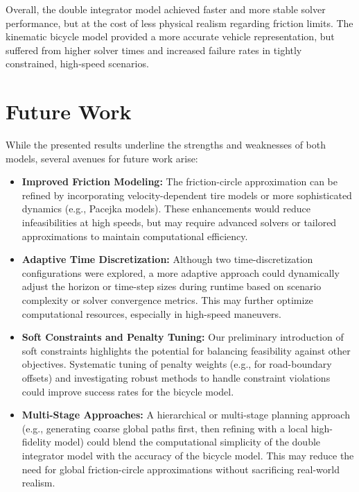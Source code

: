 Overall, the double integrator model achieved faster and more stable solver performance, but at the cost of less physical realism regarding friction
limits.
The kinematic bicycle model provided a more accurate vehicle representation, but suffered from higher solver times and increased failure rates in
tightly constrained, high-speed scenarios.

\section{Future Work} \label{subsec:future_work}

While the presented results underline the strengths and weaknesses of both models, several avenues for future work arise:

\begin{itemize} \item \textbf{Improved Friction Modeling:}
	      The friction-circle approximation can be refined by incorporating velocity-dependent tire models or more sophisticated dynamics (e.g., Pacejka
	      models).
	      These enhancements would reduce infeasibilities at high speeds, but may require advanced solvers or tailored approximations to maintain computational
	      efficiency.
	\item \textbf{Adaptive Time Discretization:}
	      Although two time-discretization configurations were explored, a more adaptive approach could dynamically adjust the horizon or time-step sizes
	      during runtime based on scenario complexity or solver convergence metrics.
	      This may further optimize computational resources, especially in high-speed maneuvers.

	\item \textbf{Soft Constraints and Penalty Tuning:}
	      Our preliminary introduction of soft constraints highlights the potential for balancing feasibility against other objectives.
	      Systematic tuning of penalty weights (e.g., for road-boundary offsets) and investigating robust methods to handle constraint violations could improve
	      success rates for the bicycle model.

	\item \textbf{Multi-Stage Approaches:}
	      A hierarchical or multi-stage planning approach (e.g., generating coarse global paths first, then refining with a local high-fidelity model) could
	      blend the computational simplicity of the double integrator model with the accuracy of the bicycle model.
	      This may reduce the need for global friction-circle approximations without sacrificing real-world realism.


\end{itemize}
